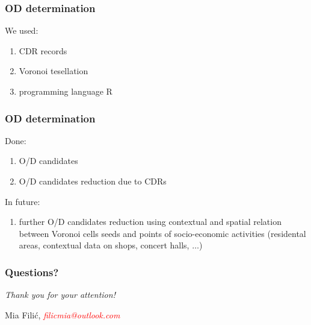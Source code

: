 \documentclass[11pt]{beamer}
\begin{document}
\begin{frame}
   \frametitle{OD determination}
   We used:
 \begin{enumerate}
        \item CDR records
        \item Voronoi tesellation
        \item programming language R
      \end{enumerate}

\end{frame}

\begin{frame}
   \frametitle{OD determination}
   Done:
 \begin{enumerate}
        \item O/D candidates
        \item O/D candidates reduction due to CDRs
      \end{enumerate}
  In future:
 \begin{enumerate}
        \item further O/D candidates reduction using contextual and spatial relation between Voronoi cells seeds and points of socio-economic activities (residental areas, contextual data on shops, 
        concert halls, $\hdots$)
      \end{enumerate}

\end{frame}

\begin{frame}
\frametitle{Questions?}
\centering \LARGE 
  \emph{Thank you for your attention!}\newline
  \newline
\centering \normalsize

Mia Filić, \textcolor{red}{\textit{filicmia@outlook.com}}
\end{frame}
\end{document}
